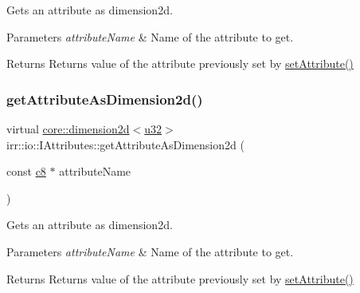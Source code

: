 Gets an attribute as dimension2d. 


\begin{DoxyParams}{Parameters}
{\em attribute\+Name} & Name of the attribute to get. \\
\hline
\end{DoxyParams}
\begin{DoxyReturn}{Returns}
Returns value of the attribute previously set by \hyperlink{classirr_1_1io_1_1IAttributes_a03fa31acb481ae23678676cc183f09a6}{set\+Attribute()} 
\end{DoxyReturn}
\mbox{\label{classirr_1_1io_1_1IAttributes_a150afece0c99c98668a8f21247f2396f}} 
\subsubsection{\texorpdfstring{get\+Attribute\+As\+Dimension2d()}{getAttributeAsDimension2d()}\hspace{0.1cm}{\footnotesize\ttfamily [2/4]}}
{\footnotesize\ttfamily virtual \hyperlink{classirr_1_1core_1_1dimension2d}{core\+::dimension2d}$<$\hyperlink{namespaceirr_a0416a53257075833e7002efd0a18e804}{u32}$>$ irr\+::io\+::\+I\+Attributes\+::get\+Attribute\+As\+Dimension2d (\begin{DoxyParamCaption}\item[{const \hyperlink{namespaceirr_a9395eaea339bcb546b319e9c96bf7410}{c8} $\ast$}]{attribute\+Name }\end{DoxyParamCaption})\hspace{0.3cm}{\ttfamily [pure virtual]}}



Gets an attribute as dimension2d. 


\begin{DoxyParams}{Parameters}
{\em attribute\+Name} & Name of the attribute to get. \\
\hline
\end{DoxyParams}
\begin{DoxyReturn}{Returns}
Returns value of the attribute previously set by \hyperlink{classirr_1_1io_1_1IAttributes_a03fa31acb481ae23678676cc183f09a6}{set\+Attribute()} 
\end{DoxyReturn}
\mbox{\label{classirr_1_1io_1_1IAttributes_a07f89c0d3670df87242cf8b82a8c7e3f}} 
